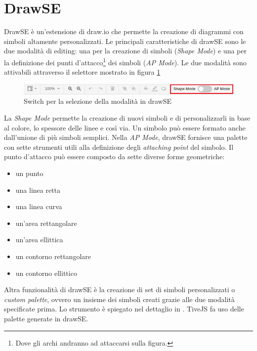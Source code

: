     \section{DrawSE}
        DrawSE è un'estensione di draw.io che permette la creazione di diagrammi con simboli altamente personalizzati. Le principali caratteristiche di drawSE sono le due modalità di editing: una per la creazione di simboli (\textit{Shape Mode}) e una per la definizione dei punti d'attacco\footnote{Dove gli archi andranno ad attaccarsi sulla figura.} dei simboli (\textit{AP Mode}).
        Le due modalità sono attivabili attraverso il selettore mostrato in figura \ref{fig:mode_switch}
        \begin{figure}[htbp]
            \centering
            \includegraphics[scale=0.7]{Figure/mode_switch.png}
            \caption{Switch per la selezione della modalità in drawSE}
            \label{fig:mode_switch}
        \end{figure}
        \newline
        La \textit{Shape Mode} permette la creazione di nuovi simboli e di personalizzarli in base al colore, lo spessore delle linee e così via. Un simbolo può essere formato anche dall'unione di più simboli semplici.
        Nella \textit{AP Mode}, drawSE fornisce una palette con sette strumenti utili alla definizione degli \textit{attaching point} del simbolo. Il punto d'attacco può essere composto da sette diverse forme geometriche:
        \begin{itemize}
            \item un punto
            \item una linea retta
            \item una linea curva
            \item un'area rettangolare
            \item un'area ellittica
            \item un contorno rettangolare
            \item un contorno ellittico
        \end{itemize}
        Altra funzionalità di drawSE è la creazione di set di simboli personalizzati o \textit{custom palette}, ovvero un insieme dei simboli creati grazie alle due modalità specificate prima. Lo strumento è spiegato nel dettaglio in \cite{drawSE}. TiveJS fa uso delle palette generate in drawSE.
